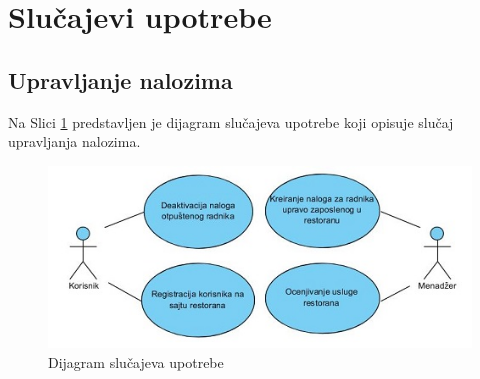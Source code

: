\newpage
\section{Slu\v cajevi upotrebe}
\subsection{Upravljanje nalozima}

Na Slici \ref{fig:slika3} predstavljen je dijagram slučajeva upotrebe koji opisuje slučaj upravljanja nalozima.

\begin{figure}[!h]
    \includegraphics[width=1\textwidth]{slike/Upravljanje_nalozima.JPG}
    \caption{Dijagram slučajeva upotrebe}
    \label{fig:slika3}
\end{figure}

